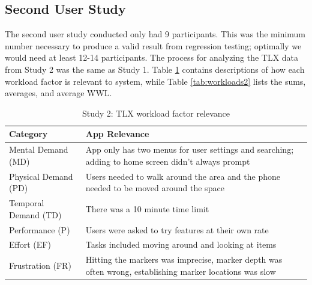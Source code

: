 \documentclass[thesis]{fputhesis}
\newcommand{\ra}[1]{\renewcommand{\arraystretch}{#1}}
\begin{document}
\begin{body}
\filbreak
\subsection{Second User Study}
The second user study conducted only had 9 participants. This was the minimum number necessary to produce a valid result from regression testing; optimally we would need at least 12-14 participants. The process for analyzing the TLX data from Study 2 was the same as Study 1. Table \ref{tab:tlx-definitions2} contains descriptions of how each workload factor is relevant to system, while Table \ref{tab:workloads2} lists the sums, averages, and average WWL. 

\begin{table}[h]\centering
\caption{Study 2: TLX workload factor relevance }\label{tab:tlx-definitions2}
\ra{1.3}
    \begin{tabular}{@{}>{\raggedright\arraybackslash}p{}>{\raggedright\arraybackslash}p{}@{}}
        \toprule
            \textbf{Category}   &   \textbf{App Relevance}  \\
        \midrule
            Mental Demand (MD)      &   App only has two menus for user settings and searching; adding to home screen didn't always prompt   \\
            Physical Demand (PD)    &   Users needed to walk around the area and the phone needed to be moved around the space  \\
            Temporal Demand (TD)    &   There was a 10 minute time limit                   \\
            Performance (P)         &   Users were asked to try features at their own rate \\
            Effort (EF)             &   Tasks included moving around and looking at items  \\
            Frustration (FR)        &   Hitting the markers was imprecise, marker depth was often wrong, establishing marker locations was slow \\
        \bottomrule
    \end{tabular}%
\end{table}


\end{body}
\end{document}
